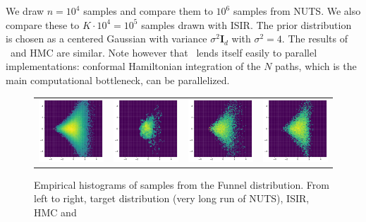 \documentclass{article}
\begin{document}
We draw $n = 10^4$ samples and compare them to  $10^6$ samples from  NUTS.
We also compare these to $K\cdot 10^4 = 10^5$ samples drawn with ISIR. The prior distribution is chosen as a centered Gaussian with variance $\sigma^2\mathbf{I}_d$ with $\sigma^2=4$. The results of \IFIS\ and HMC are similar. Note however that \IFIS\ lends itself easily to  parallel implementations: conformal Hamiltonian integration of the $N$ paths, which is the main computational bottleneck, can be parallelized.\\ 
\begin{figure}[!ht]
\caption{Empirical histograms of samples from the Funnel distribution.
From left to right, target distribution (very long run of NUTS), ISIR, HMC and \InFiNE}
    \label{fig:funnel_samples}
    \centering
    \begin{tabular}{cccc}
       \includegraphics[width=.22\linewidth]{pics/histogram_true_funnel1.pdf}
         &  
          \includegraphics[width=.22\linewidth]{pics/histogram_isir_funnel1.pdf}
          &
           \includegraphics[width=.22\linewidth]{pics/histogram_nuts_funnel1.pdf}
           &
            \includegraphics[width=.22\linewidth]{pics/histogram_infine_funnel2.pdf}
    \end{tabular}
\end{figure}
\end{document}
